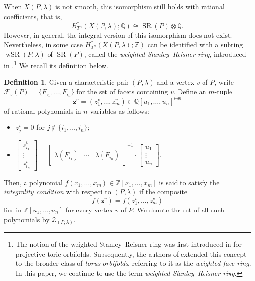 \documentclass[10pt]{amsart}
\theoremstyle{plain}
\theoremstyle{definition}
\newtheorem{definition}[theorem]{Definition}
\numberwithin{equation}{section}
\newcommand{\QQ}{\mathbb{Q}}
\newcommand{\ZZ}{\mathbb{Z}}
\DeclareMathOperator{\wSR}{wSR}
\DeclareMathOperator{\SR}{SR}
\begin{document}
When $X(P,\lambda)$ is not smooth, this isomorphism still holds with rational coefficients, that is,
\begin{equation}\label{eq_rational_cohom_isom}
H^\ast_{T^n}(X(P, \lambda);\QQ) \cong \SR(P)\otimes\QQ.
\end{equation}
However, in general, the integral version of this isomorphism does not exist. Nevertheless, in some case $H^*_{T^n}(X(P,\lambda);\ZZ)$ can be identified with a subring $\wSR(P, \lambda)$ of $\SR(P)$, called the \emph{weighted Stanley--Reisner ring}, introduced in \cite{BSS, DKS}.\footnote{The notion of the weighted Stanley--Reisner ring was first introduced in \cite{BSS} for projective toric orbifolds. Subsequently, the authors of \cite{DKS} extended this concept to the broader class of \emph{torus orbifolds}, referring to it as the \emph{weighted face ring}. In this paper, we continue to use the term \emph{weighted Stanley--Reisner ring}.}
We recall its definition below.





\begin{definition}\label{def_int_cond}
Given a characteristic pair $(P,\lambda)$ and a vertex $v$ of $P$, write $\mathcal{F}_v(P)=\{F_{i_1},\ldots,F_{i_n}\}$ for the set of facets containing $v$. Define an $m$-tuple
\[
\mathbf{z}^v=(z^v_1,\ldots,z^v_m)\in \QQ[u_1,\ldots,u_n]^{\oplus m}
\]
of rational polynomials in $n$ variables as follows:
\begin{itemize}
\item $z^v_j = 0$ for $j\notin \{i_1, \dots, i_n\}$;
\item $\begin{bmatrix} z^v_{i_1} \\ \vdots \\ z^v_{i_n} \end{bmatrix} = 
\left[ \begin{array}{c|c|c} 
& & \\
\lambda(F_{i_1}) & \cdots &  \lambda(F_{i_n}) \\
& & 
\end{array}\right]^{-1}
\cdot \begin{bmatrix} u_1 \\ \vdots  \\ u_n \end{bmatrix}
$.
\end{itemize}
Then, a polynomial $f(x_1, \dots, x_m)\in \ZZ[x_1, \dots, x_m]$ is said to satisfy the \emph{integrality condition} with respect to $(P, \lambda)$ if the composite
\[
f(\mathbf{z}^v)=f(z^v_1,\ldots,z^v_m)
\]
lies in $\ZZ[u_1,\ldots,u_n]$ for every vertex $v$ of $P$.
We denote the set of all such polynomials by $\mathscr{Z}_{(P,\lambda)}$.
\end{definition}
\end{document}

